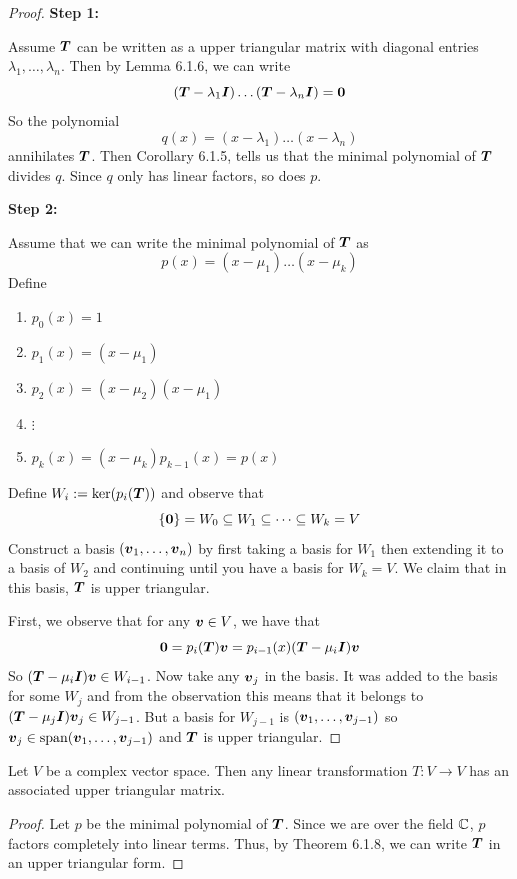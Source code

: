 \begin{proof}

\textbf{Step 1:}

    Assume $\boldsymbol{T}$ can be written as a upper triangular matrix with diagonal entries $\lambda_1,\dots,\lambda_n$. Then by Lemma 6.1.6, we can write
    \[
    (\boldsymbol{T}-\lambda_1\boldsymbol{I})\dots(\boldsymbol{T}-\lambda_n\boldsymbol{I})=\boldsymbol{0}
    \]
    So the polynomial
    \[
    q(x)=(x-\lambda_1)\dots(x-\lambda_n)
    \]
    annihilates $\boldsymbol{T}$. Then Corollary 6.1.5, tells us that the minimal polynomial of $\boldsymbol{T}$ divides $q$. Since $q$ only has linear factors, so does $p$.

\textbf{Step 2:}

    Assume that we can write the minimal polynomial of $\boldsymbol{T}$ as
    \[
    p(x)=(x-\mu_1)\dots(x-\mu_k)
    \]
    Define
    \begin{enumerate}
        \item $p_0(x)=1$
        \item $p_1(x)=(x-\mu_1)$
        \item $p_2(x)=(x-\mu_2)(x-\mu_1)$
        \item $\vdots$
        \item $p_k(x)=(x-\mu_k)p_{k-1}(x)=p(x)$
    \end{enumerate}
    Define $W_i:=\ker(p_i(\boldsymbol{T}))$ and observe that
    \[
    \{\boldsymbol{0}\}=W_0\subseteq W_1\subseteq\dots\subseteq W_k=V
    \]
    Construct a basis $(\boldsymbol{v}_1,\dots,\boldsymbol{v}_n)$ by first taking a basis for $W_1$ then extending it to a basis of $W_2$ and continuing until you have a basis for $W_k=V$. We claim that in this basis, $\boldsymbol{T}$ is upper triangular.

    First, we observe that for any $\boldsymbol{v}\in V$, we have that
    \[
    \boldsymbol{0}=p_i(\boldsymbol{T})\boldsymbol{v}=p_{i-1}(x)(\boldsymbol{T}-\mu_i\boldsymbol{I})\boldsymbol{v}
    \]
    So $(\boldsymbol{T}-\mu_i\boldsymbol{I})\boldsymbol{v}\in W_{i-1}$. Now take any $\boldsymbol{v}_j$ in the basis. It was added to the basis for some $W_j$ and from the observation this means that it belongs to $(\boldsymbol{T}-\mu_j\boldsymbol{I})\boldsymbol{v}_j\in W_{j-1}$. But a basis for $W_{j-1}$ is $(\boldsymbol{v}_1,\dots,\boldsymbol{v}_{j-1})$ so $\boldsymbol{v}_j\in\operatorname{span}(\boldsymbol{v}_1,\dots,\boldsymbol{v}_{j-1})$ and $\boldsymbol{T}$ is upper triangular.
\end{proof}

\begin{corollary}
    Let $V$ be a complex vector space. Then any linear transformation $T:V\to V$ has an associated upper triangular matrix.
\end{corollary}

\begin{proof}
    Let $p$ be the minimal polynomial of $\boldsymbol{T}$. Since we are over the field $\mathbb{C}$, $p$ factors completely into linear terms. Thus, by Theorem 6.1.8, we can write $\boldsymbol{T}$ in an upper triangular form.
\end{proof}

